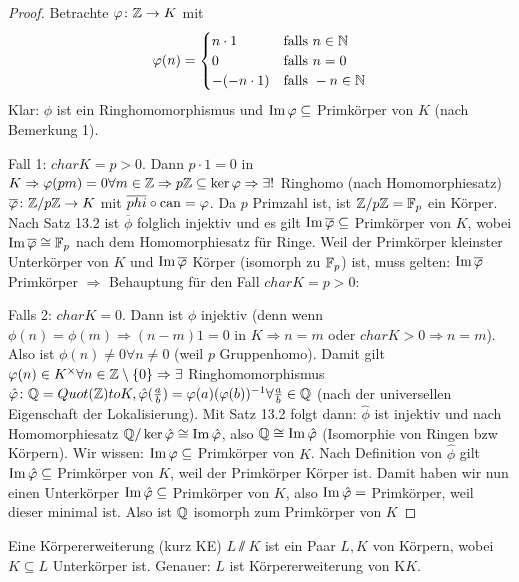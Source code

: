\documentclass[12pt,a4paper]{scrartcl}
\begin{document}
\begin{proof}
	Betrachte $\varphi\colon \mathbb Z\to K$ mit 
	$$\varphi(n ) =\begin{cases} 
	n\cdot 1 &\text{falls }n\in\mathbb N\\
						0 & \text{falls } n = 0\\
						-(-n\cdot 1) & \text{falls } -n\in\mathbb N 
					\end{cases}$$
	Klar: $\phi$ ist ein Ringhomomorphismus und $\operatorname{Im} \varphi\subseteq$ Primkörper von $K$ (nach Bemerkung 1).
	
	Fall 1: $char K = p>0$. Dann $p\cdot 1  = 0$ in $K\Rightarrow \varphi(pm) = 0\forall m\in\mathbb Z\Rightarrow p\mathbb Z\subseteq \operatorname{ker} \varphi\Rightarrow \exists!$ Ringhomo (nach Homomorphiesatz) $\overline{\varphi}\colon \mathbb Z/p\mathbb Z\to K$ mit $\overline{phi}\circ \operatorname{can}  = \varphi$. Da $p$ Primzahl ist, ist $\mathbb Z/p\mathbb Z = \mathbb F_p$ ein Körper. Nach Satz 13.2 ist $\overline{\phi}$ folglich injektiv und es gilt $\operatorname{Im}\overline{\varphi}\subseteq$ Primkörper von $K$, wobei $\operatorname{Im}\overline{\varphi} \cong \mathbb F_p$ nach dem Homomorphiesatz für Ringe. Weil der Primkörper kleinster Unterkörper von $K$ und $\operatorname{Im}\overline{\varphi}$ Körper (isomorph zu $\mathbb F_p$) ist, muss gelten: $\operatorname{Im} \overline{\varphi}$ Primkörper $\Rightarrow$ Behauptung für den Fall $char K = p> 0$:
	
	Falls 2: $char K = 0$. Dann ist $\phi$ injektiv (denn wenn $\phi(n) = \phi(m) \Rightarrow (n-m)1 = 0$ in $K\Rightarrow n = m$ oder  $char K > 0 \Rightarrow n = m$). Also ist $\phi(n) \neq 0\forall n\neq 0$ (weil $p$ Gruppenhomo). Damit gilt $\varphi(n)\in K^{\times}\forall n \in \mathbb Z\setminus\{0\}\Rightarrow \exists$ Ringhomomorphismus $\hat{\varphi}\colon \mathbb Q= Quot (\mathbb Z)to K, \hat{\varphi}(\frac ab) = \varphi(a)(\varphi(b))^{-1}\forall \frac ab\in \mathbb Q$ (nach der universellen Eigenschaft der Lokalisierung). Mit Satz 13.2 folgt dann: $\hat{\phi}$ ist injektiv und nach Homomorphiesatz $\mathbb Q/\operatorname{ker}\hat{\varphi} \cong \operatorname{Im}\hat{\varphi}$, also $\mathbb Q \cong \operatorname{Im} \hat{\varphi}$ (Isomorphie von Ringen bzw Körpern). Wir wissen: $\operatorname{Im} \varphi\subseteq$ Primkörper von $K$. Nach Definition von $\hat{\phi}$ gilt $\operatorname{Im}\hat{\varphi}\subseteq$ Primkörper von $K$, weil der Primkörper Körper ist. Damit haben wir nun einen Unterkörper $\operatorname{Im} \hat{\varphi}\subseteq $ Primkörper von $K$, also $\operatorname{Im} \hat{\varphi}= $ Primkörper, weil dieser minimal ist. Also ist $\mathbb Q$ isomorph zum Primkörper von $K$
	
\end{proof}

\begin{defi}
	Eine Körpererweiterung (kurz KE) $L\sslash K$ ist ein Paar $L, K$ von Körpern, wobei $K\subseteq L$ Unterkörper ist. Genauer: $L$ ist Körpererweiterung von K$K$.	
\end{defi}
\end{document}
